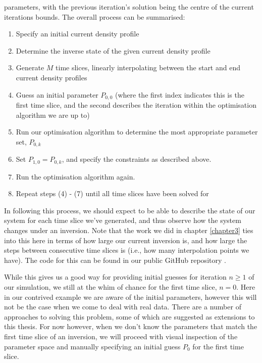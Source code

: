 parameters, with the previous iteration's solution being the centre of the current iterations bounds. The overall process 
can be summarised:
\begin{enumerate}
    \item Specify an initial current density profile
    \item Determine the inverse state of the given current density profile
    \item Generate $M$ time slices, linearly interpolating between the start and end current density profiles
    \item Guess an initial parameter $P_{0,0}$ (where the first index indicates this is the first time slice, and the second describes the iteration within the optimisation algorithm we are up to)
    \item Run our optimisation algorithm to determine the most appropriate parameter set, $P_{0, k}$
    \item Set $P_{1,0} = P_{0,k}$, and specify the constraints as described above.
    \item Run the optimisation algorithm again.
    \item Repeat steps (4) - (7) until all time slices have been solved for
\end{enumerate}
In following this process, we should expect to be able to describe the state of our system for each time slice 
we've generated, and thus observe how the system changes under an inversion. Note that the work we 
did in chapter \ref{chapter3} ties into this here in terms of how large our current inversion is, and 
how large the steps between consecutive time slices is (i.e., how many interpolation points we have).
The code for this can be found in our public GitHub repository \cite{project-source}.

\begin{remark}
    While this gives us a good way for providing initial guesses for iteration $n \ge 1$ of our simulation, we 
    still at the whim of chance for the first time slice, $n = 0$. Here in our contrived example we are aware of the initial parameters, 
    however this will not be the case when we come to deal with real data. There are a number of approaches to solving this problem, 
    some of which are suggested as extensions to this thesis. For now however, when we don't know 
    the parameters that match the first time slice of an inversion, we will proceed with visual inspection of the parameter space and manually 
    specifying an initial guess $P_0$ for the first time slice.
\end{remark}


